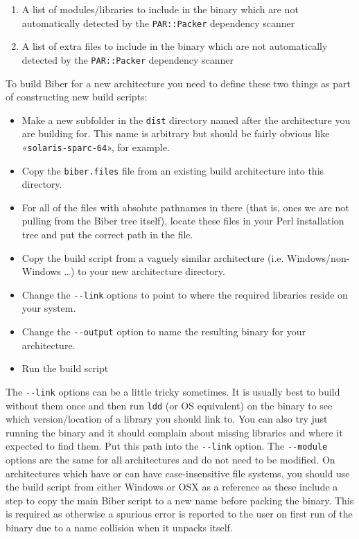 \documentclass{ltxdockit}
\begin{document}
\begin{enumerate}
\item A list of modules/libraries to include in the binary which are not
  automatically detected by the \verb+PAR::Packer+ dependency
  scanner
\item A list of extra files to include in the binary which are not
  automatically detected by the \verb+PAR::Packer+ dependency
  scanner
\end{enumerate}

\noindent To build Biber for a new architecture you need to
define these two things as part of constructing new build scripts:

\begin{itemize}
\item Make a new subfolder in the \verb+dist+ directory named after the
  architecture you are building for. This name is arbitrary but should
  be fairly obvious like «\verb+solaris-sparc-64+», for example.
\item Copy the \verb+biber.files+ file from an existing build
  architecture into this directory.
\item For all of the files with absolute pathnames in there (that is,
  ones we are not pulling from the Biber tree itself), locate these
  files in your Perl installation tree and put the correct path in the
  file.
\item Copy the build script from a vaguely similar architecture
  (i.e. Windows/non-Windows \ldots) to your new architecture
  directory. 
\item Change the \verb+--link+ options to point to where the required
  libraries reside on your system.
\item Change the \verb+--output+ option to name the resulting binary
  for your architecture.
\item Run the build script
\end{itemize}

\noindent The \verb+--link+ options can be a little tricky
sometimes. It is usually best to build without them once and then run
\verb+ldd+ (or OS equivalent) on the binary to see which
version/location of a library you should link to. You can also try
just running the binary and it should complain about missing libraries
and where it expected to find them. Put this path into the
\verb+--link+ option. The \verb+--module+ options are the same for all
architectures and do not need to be modified.
On architectures which have or can have case-insensitive file systems,
you should use the build script from either Windows or OSX as a reference
as these include a step to copy the main Biber script to a new name
before packing the binary. This is required as otherwise a spurious
error is reported to the user on first run of the binary due to a name
collision when it unpacks itself.
\end{document}
